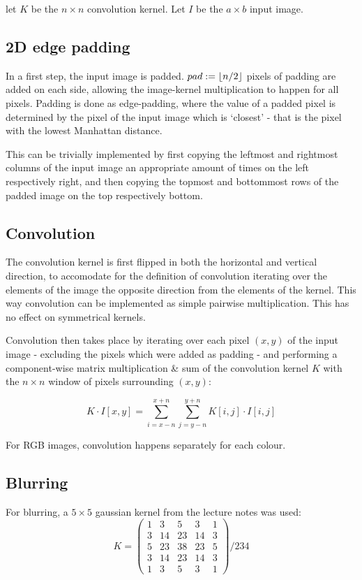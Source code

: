 \documentclass[a4paper]{scrreprt}
\DeclarePairedDelimiter\floor{\lfloor}{\rfloor}
\begin{document}
let $K$ be the $n \times n$ convolution kernel. Let $I$ be the $a \times b$ input
image.

\subsection{2D edge padding}

In a first step, the input image is padded. $pad := \floor{n / 2}$ pixels of
padding are added on each side, allowing the image-kernel multiplication to
happen for all pixels. Padding is done as edge-padding, where the value of a
padded pixel is determined by the pixel of the input image which is `closest' -
that is the pixel with the lowest Manhattan distance.

This can be trivially implemented by first copying the leftmost and rightmost
columns of the input image an appropriate amount of times on the left
respectively right, and then copying the topmost and bottommost rows of the
padded image on the top respectively bottom.

\subsection{Convolution}

The convolution kernel is first flipped in both the horizontal and vertical
direction, to accomodate for the definition of convolution iterating over the
elements of the image the opposite direction from the elements of the kernel.
This way convolution can be implemented as simple pairwise multiplication. This
has no effect on symmetrical kernels.

Convolution then takes place by iterating over each pixel $(x, y)$ of the input
image - excluding the pixels which were added as padding - and performing a
component-wise matrix multiplication \& sum of the convolution kernel $K$ with
the $n \times n$ window of pixels surrounding $(x, y)$:

\[
		K \cdot I[x, y] = \sum_{i = x - n}^{x+n} \sum_{j = y - n}^{y + n} K[i, j] \cdot I[i, j]
\]

For RGB images, convolution happens separately for each colour.

\subsection{Blurring}

For blurring, a $5 \times 5$ gaussian kernel from the lecture notes was used:
\[
		K = \begin{pmatrix}
				1 & 3 & 5 & 3 & 1 \\
				3 & 14 & 23 & 14 & 3 \\
				5 & 23 & 38 & 23 & 5 \\
				3 & 14 & 23 & 14 & 3 \\
				1 & 3 & 5 & 3 & 1
		\end{pmatrix} / 234
\]
\end{document}

